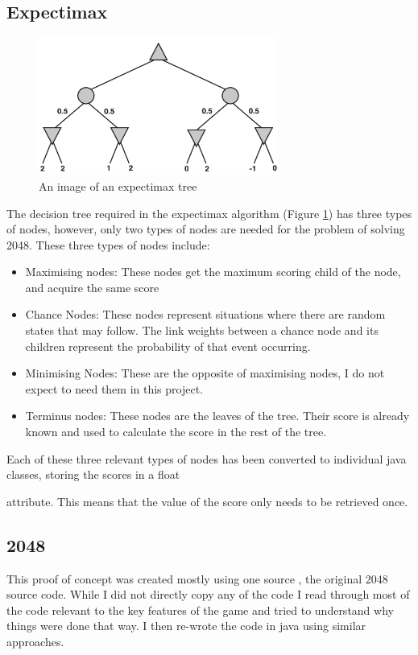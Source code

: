 \documentclass{article}
\begin{document}
\subsection{Expectimax}
\label{subsec:expectimax}
\begin{figure}
    \centering
    \includegraphics[width=0.7\textwidth]{expectimax.png}
    \caption{An image of an expectimax tree \cite[p.~200]{russell2010artificial}}
    \label{fig:expectree}
\end{figure}
The decision tree required in the expectimax algorithm (Figure \ref{fig:expectree}) has three types of nodes, however, only two types of nodes are needed for the problem of solving 2048. These three types of nodes include:
\begin{itemize}
    \item Maximising nodes: These nodes get the maximum scoring child of the node, and acquire the same score
    \item Chance Nodes: These nodes represent situations where there are random states that may follow. The link weights between
    a chance node and its children represent the probability of that event occurring.
    \item Minimising Nodes: These are the opposite of maximising nodes, I do not expect to need them in this project.
    \item Terminus nodes: These nodes are the leaves of the tree. Their score is already known and used to calculate the score in the rest of the tree.
\end{itemize}
Each of these three relevant types of nodes has been converted to individual java classes, storing the scores in a float

attribute. This means that the value of the score only needs to be retrieved once.

\subsection{2048}
\label{subsec:2048}
This proof of concept was created mostly using one source \cite{source2048}, the original 2048 source code. While I did not
directly copy any of the code I read through most of the code relevant to the key features of the game and tried to understand 
why things were done that way. I then re-wrote the code in java using similar approaches.
\end{document}
